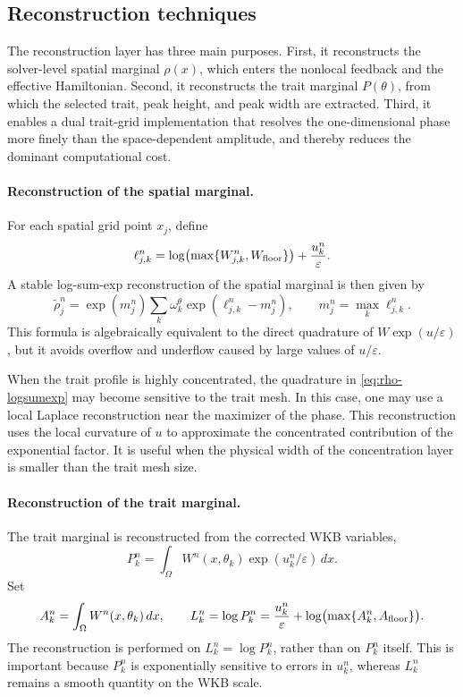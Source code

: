 \documentclass[11pt]{article}
\begin{document}
\subsection{Reconstruction techniques}

The reconstruction layer has three main purposes.  First, it reconstructs the
solver-level spatial marginal \(\rho(x)\), which enters the nonlocal feedback
and the effective Hamiltonian.  Second, it reconstructs the trait marginal
\(P(\theta)\), from which the selected trait, peak height, and peak width are
extracted.  Third, it enables a dual trait-grid implementation that resolves
the one-dimensional phase more finely than the space-dependent amplitude, and
thereby reduces the dominant computational cost.

\paragraph{Reconstruction of the spatial marginal.}

For each spatial grid point \(x_j\), define
\[
    \ell_{j,k}^n
    =
    \log\bigl(\max\{W_{j,k}^n,W_{\rm floor}\}\bigr)
    +
    \frac{u_k^n}{\varepsilon}.
\]
A stable log-sum-exp reconstruction of the spatial marginal is then given by
\begin{equation}
    \widetilde\rho_j^n
    =
    \exp(m_j^n)
    \sum_k \omega_k^\theta \exp(\ell_{j,k}^n-m_j^n),
    \qquad
    m_j^n=\max_k \ell_{j,k}^n .
    \label{eq:rho-logsumexp}
\end{equation}
This formula is algebraically equivalent to the direct quadrature of
\(W\exp(u/\varepsilon)\), but it avoids overflow and underflow caused by large
values of \(u/\varepsilon\).

When the trait profile is highly concentrated, the quadrature in
\eqref{eq:rho-logsumexp} may become sensitive to the trait mesh.  In this case,
one may use a local Laplace reconstruction near the maximizer of the phase.
This reconstruction uses the local curvature of \(u\) to approximate the
concentrated contribution of the exponential factor.  It is useful when the
physical width of the concentration layer is smaller than the trait mesh size.

\paragraph{Reconstruction of the trait marginal.}

The trait marginal is reconstructed from the corrected WKB variables,
\[
    P_k^n
    =
    \int_\Omega W^n(x,\theta_k)
    \exp(u_k^n/\varepsilon)\,dx .
\]
Set
\[
    A_k^n=\int_\Omega W^n(x,\theta_k)\,dx,
    \qquad
    L_k^n
    =
    \log P_k^n
    =
    \frac{u_k^n}{\varepsilon}
    +
    \log\bigl(\max\{A_k^n,A_{\rm floor}\}\bigr).
\]
The reconstruction is performed on \(L_k^n=\log P_k^n\), rather than on
\(P_k^n\) itself.  This is important because \(P_k^n\) is exponentially
sensitive to errors in \(u_k^n\), whereas \(L_k^n\) remains a smooth quantity on
the WKB scale.
\end{document}
